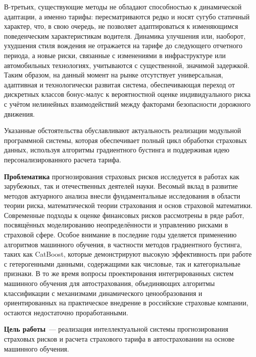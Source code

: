 В-третьих, существующие методы не обладают способностью к динамической адаптации, а именно тарифы: пересматриваются редко и носят сугубо статичный характер, что, в свою очередь, не позволяет адаптироваться к изменяющимся поведенческим характеристикам водителя. Динамика улучшения или, наоборот, ухудшения стиля вождения не отражается на тарифе до следующего отчетного периода, а новые риски, связанные с изменениями в инфраструктуре или автомобильных технологиях, учитываются с существенной, значимой задержкой. Таким образом, на данный момент на рынке отсутствует универсальная, адаптивная и технологически развитая система, обеспечивающая переход от дискретных классов бонус-малус к вероятностной оценке индивидуального риска с учётом нелинейных взаимодействий между факторами безопасности дорожного движения.

Указанные обстоятельства обуславливают актуальность реализации модульной программной системы, которая обеспечивает полный цикл обработки страховых данных, используя алгоритмы градиентного бустинга и поддерживая идею персонализированного расчета тарифа.

\textbf{Проблематика} прогнозирования страховых рисков исследуется в работах как зарубежных, так и отечественных деятелей науки. Весомый вклад в развитие методов актуарного анализа внесли фундаментальные исследования в области теории риска, математической теории страхования и основ страховой математики. Современные подходы к оценке финансовых рисков рассмотрены в ряде работ, посвящённых моделированию неопределённости и управлению рисками в страховой сфере. Особое внимание в последние годы уделяется применению алгоритмов машинного обучения, в частности методов градиентного бустинга, таких как CatBoost, которые демонстрируют высокую эффективность при работе с гетерогенными данными, содержащими как числовые, так и категориальные признаки. В то же время вопросы проектирования интегрированных систем машинного обучения для автострахования, объединяющих алгоритмы классификации с механизмами динамического ценообразования и ориентированных на практическое внедрение в российские страховые компании, остаются недостаточно проработанными.

\textbf{Цель работы}~--- реализация интеллектуальной системы прогнозирования страховых рисков и расчета страхового тарифа в автостраховании на основе машинного обучения.


